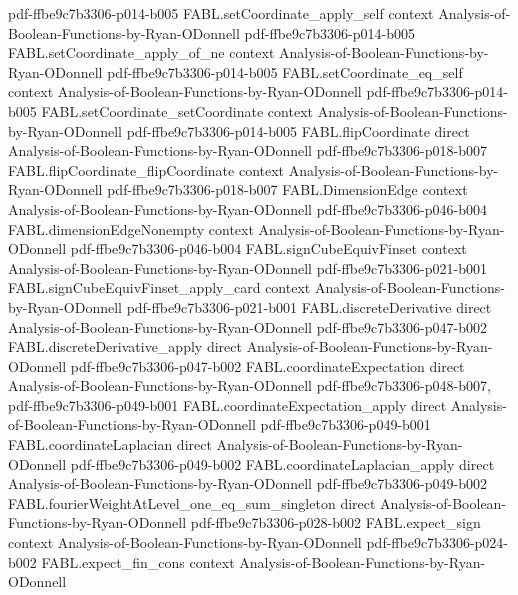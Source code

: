 \begin{theorem}
  {pdf-ffbe9c7b3306-p014-b005}
\proofstep
  {FABL.setCoordinate_apply_self}
  {context}
  {Analysis-of-Boolean-Functions-by-Ryan-ODonnell}
  {pdf-ffbe9c7b3306-p014-b005}
\proofstep
  {FABL.setCoordinate_apply_of_ne}
  {context}
  {Analysis-of-Boolean-Functions-by-Ryan-ODonnell}
  {pdf-ffbe9c7b3306-p014-b005}
\proofstep
  {FABL.setCoordinate_eq_self}
  {context}
  {Analysis-of-Boolean-Functions-by-Ryan-ODonnell}
  {pdf-ffbe9c7b3306-p014-b005}
\proofstep
  {FABL.setCoordinate_setCoordinate}
  {context}
  {Analysis-of-Boolean-Functions-by-Ryan-ODonnell}
  {pdf-ffbe9c7b3306-p014-b005}
\proofstep
  {FABL.flipCoordinate}
  {direct}
  {Analysis-of-Boolean-Functions-by-Ryan-ODonnell}
  {pdf-ffbe9c7b3306-p018-b007}
\proofstep
  {FABL.flipCoordinate_flipCoordinate}
  {context}
  {Analysis-of-Boolean-Functions-by-Ryan-ODonnell}
  {pdf-ffbe9c7b3306-p018-b007}
\proofstep
  {FABL.DimensionEdge}
  {context}
  {Analysis-of-Boolean-Functions-by-Ryan-ODonnell}
  {pdf-ffbe9c7b3306-p046-b004}
\proofstep
  {FABL.dimensionEdgeNonempty}
  {context}
  {Analysis-of-Boolean-Functions-by-Ryan-ODonnell}
  {pdf-ffbe9c7b3306-p046-b004}
\proofstep
  {FABL.signCubeEquivFinset}
  {context}
  {Analysis-of-Boolean-Functions-by-Ryan-ODonnell}
  {pdf-ffbe9c7b3306-p021-b001}
\proofstep
  {FABL.signCubeEquivFinset_apply_card}
  {context}
  {Analysis-of-Boolean-Functions-by-Ryan-ODonnell}
  {pdf-ffbe9c7b3306-p021-b001}
\proofstep
  {FABL.discreteDerivative}
  {direct}
  {Analysis-of-Boolean-Functions-by-Ryan-ODonnell}
  {pdf-ffbe9c7b3306-p047-b002}
\proofstep
  {FABL.discreteDerivative_apply}
  {direct}
  {Analysis-of-Boolean-Functions-by-Ryan-ODonnell}
  {pdf-ffbe9c7b3306-p047-b002}
\proofstep
  {FABL.coordinateExpectation}
  {direct}
  {Analysis-of-Boolean-Functions-by-Ryan-ODonnell}
  {pdf-ffbe9c7b3306-p048-b007,
    pdf-ffbe9c7b3306-p049-b001}
\proofstep
  {FABL.coordinateExpectation_apply}
  {direct}
  {Analysis-of-Boolean-Functions-by-Ryan-ODonnell}
  {pdf-ffbe9c7b3306-p049-b001}
\proofstep
  {FABL.coordinateLaplacian}
  {direct}
  {Analysis-of-Boolean-Functions-by-Ryan-ODonnell}
  {pdf-ffbe9c7b3306-p049-b002}
\proofstep
  {FABL.coordinateLaplacian_apply}
  {direct}
  {Analysis-of-Boolean-Functions-by-Ryan-ODonnell}
  {pdf-ffbe9c7b3306-p049-b002}
\proofstep
  {FABL.fourierWeightAtLevel_one_eq_sum_singleton}
  {direct}
  {Analysis-of-Boolean-Functions-by-Ryan-ODonnell}
  {pdf-ffbe9c7b3306-p028-b002}
\proofstep
  {FABL.expect_sign}
  {context}
  {Analysis-of-Boolean-Functions-by-Ryan-ODonnell}
  {pdf-ffbe9c7b3306-p024-b002}
\proofstep
  {FABL.expect_fin_cons}
  {context}
  {Analysis-of-Boolean-Functions-by-Ryan-ODonnell}

\end{theorem}
